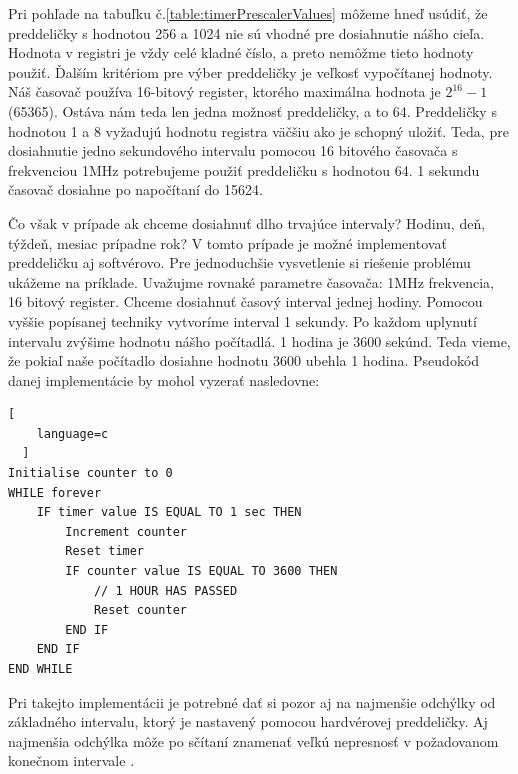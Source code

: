 Pri pohľade na tabuľku č.\ref{table:timerPrescalerValues} môžeme hneď usúdiť, že preddeličky s hodnotou 256 a 1024 nie sú vhodné pre dosiahnutie nášho cieľa. Hodnota v registri je vždy celé kladné číslo, a preto nemôžme tieto hodnoty použiť. Ďalším kritériom pre výber preddeličky je veľkosť
vypočítanej hodnoty. Náš časovač používa 16-bitový register, ktorého maximálna hodnota je $2^{16} -1$ (65365).
Ostáva nám teda len jedna možnosť preddeličky, a to 64. Preddeličky s hodnotou 1 a 8 vyžadujú hodnotu registra väčšiu ako je schopný uložiť.
Teda, pre dosiahnutie jedno sekundového intervalu pomocou 16 bitového časovača s frekvenciou 1MHz potrebujeme použiť preddeličku s hodnotou 64.
1 sekundu časovač dosiahne po napočítaní do 15624. \par
Čo však v prípade ak chceme dosiahnuť dlho trvajúce intervaly? Hodinu, deň, týždeň, mesiac prípadne rok?
V tomto prípade je možné implementovať preddeličku aj softvérovo. Pre jednoduchšie vysvetlenie si riešenie problému ukážeme na príklade. Uvažujme rovnaké parametre časovača: 1MHz frekvencia, 16 bitový register. Chceme dosiahnuť časový interval jednej hodiny. Pomocou vyššie popísanej techniky vytvoríme interval 1 sekundy.
Po každom uplynutí intervalu zvýšime hodnotu nášho počítadlá. 1 hodina je 3600 sekúnd. Teda vieme, že pokiaľ naše počítadlo dosiahne hodnotu 3600 ubehla 1 hodina.
Pseudokód danej implementácie by mohol vyzerať nasledovne:
\begin{lstlisting}[
    language=c
  ]  
Initialise counter to 0
WHILE forever
    IF timer value IS EQUAL TO 1 sec THEN
        Increment counter
        Reset timer
        IF counter value IS EQUAL TO 3600 THEN
            // 1 HOUR HAS PASSED
            Reset counter
        END IF
    END IF
END WHILE
\end{lstlisting}
Pri takejto implementácii je potrebné dať si pozor aj na najmenšie odchýlky od základného intervalu, ktorý je nastavený pomocou hardvérovej preddeličky.
Aj najmenšia odchýlka môže po sčítaní znamenať veľkú nepresnosť v požadovanom konečnom intervale \cite{cameraNewbieGuideAVR2015}.

